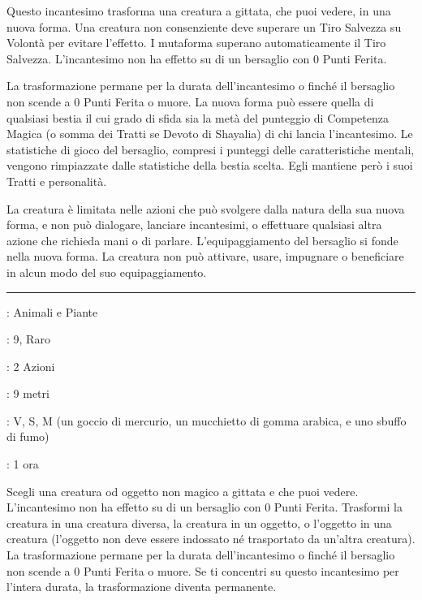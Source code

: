 \begin{multicols}{2}
Questo incantesimo trasforma una creatura a gittata, che puoi vedere, in una nuova forma. Una creatura non consenziente deve superare un Tiro Salvezza su Volontà per evitare l'effetto. I mutaforma superano automaticamente il Tiro Salvezza. L'incantesimo non ha effetto su di un bersaglio con 0 Punti Ferita.

La trasformazione permane per la durata dell'incantesimo o finché il bersaglio non scende a 0 Punti Ferita o muore. La nuova forma può essere quella di qualsiasi bestia il cui grado di sfida sia la metà del punteggio di Competenza Magica (o somma dei Tratti se Devoto di Shayalia) di chi lancia l'incantesimo. Le statistiche di gioco del bersaglio, compresi i punteggi delle caratteristiche mentali, vengono rimpiazzate dalle statistiche della bestia scelta. Egli mantiene però i suoi Tratti e personalità.

La creatura è limitata nelle azioni che può svolgere dalla natura della sua nuova forma, e non può dialogare, lanciare incantesimi, o effettuare qualsiasi altra azione che richieda mani o di parlare. L'equipaggiamento del bersaglio si fonde nella nuova forma. La creatura non può attivare, usare, impugnare o beneficiare in alcun modo del suo equipaggiamento.

\smallskip\noindent\rule{\linewidth}{2pt} \hypertarget{Metamorfosi Pura}{}\medskip{}
\noindent
\begin{description}[noitemsep, topsep=0pt, parsep=0pt, partopsep=0pt, leftmargin=0cm, labelwidth=2.8cm]
	\item[\textbf{Lista di Magia}]: Animali e Piante
	\item[\textbf{Livello}]: 9, Raro
	\item[\textbf{T. di Lancio}]: 2 Azioni
	\item[\textbf{Gittata}]: 9 metri
	\item[\textbf{Componenti}]: V, S, M (un goccio di mercurio, un mucchietto di gomma arabica, e uno sbuffo di fumo)
	\item[\textbf{Durata}]: 1 ora
\end{description}

Scegli una creatura od oggetto non magico a gittata e che puoi vedere. L'incantesimo non ha effetto su di un bersaglio con 0 Punti Ferita. Trasformi la creatura in una creatura diversa, la creatura in un oggetto, o l'oggetto in una creatura (l'oggetto non deve essere indossato né trasportato da un'altra creatura). La trasformazione permane per la durata dell'incantesimo o finché il bersaglio non scende a 0 Punti Ferita o muore. Se ti concentri su questo incantesimo per l'intera durata, la trasformazione diventa permanente.


\end{multicols}
